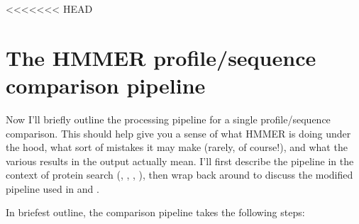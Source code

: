 <<<<<<< HEAD

\chapter{The HMMER profile/sequence comparison pipeline}
\label{chapter:pipeline}
\setcounter{footnote}{0}

Now I'll briefly outline the processing pipeline for a single
profile/sequence comparison. This should help
give you a sense of what HMMER is doing under the hood, what sort of
mistakes it may make (rarely, of course!), and what the various
results in the output actually mean. I'll first describe the pipeline
in the context of protein search (, ,
, ), then wrap back around to discuss
the modified pipeline used in  and .

In briefest outline, the comparison pipeline takes the following
steps:

